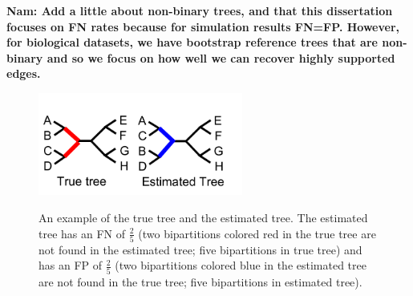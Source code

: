 \textbf{Nam:  Add a little about non-binary trees, and that this dissertation focuses on FN rates because for simulation results FN=FP.  However, for biological datasets, we have bootstrap reference trees that are non-binary and so we focus on how well we can recover highly supported edges.  }


\begin{figure}[htbp]
\centering
{\includegraphics[width=0.60\textwidth]{background/unrooted_phylogeny_a}}
\caption[Computing error metrics of estimated tree.]{An example of the true tree and the estimated tree.  The estimated tree has an FN of $\frac{2}{5}$ (two bipartitions colored red in the true tree are not found in the estimated tree; five bipartitions in true tree) and has an FP of $\frac{2}{5}$ (two bipartitions colored blue in the estimated tree are not found in the true tree; five bipartitions in estimated tree).}  
\label{back:tree_error}
\end{figure}








